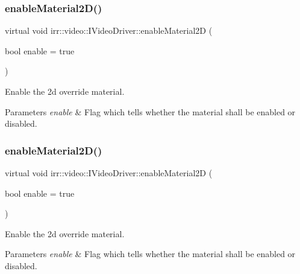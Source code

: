 \subsubsection{\texorpdfstring{enable\+Material2\+D()}{enableMaterial2D()}\hspace{0.1cm}{\footnotesize\ttfamily [1/2]}}
{\footnotesize\ttfamily virtual void irr\+::video\+::\+I\+Video\+Driver\+::enable\+Material2D (\begin{DoxyParamCaption}\item[{bool}]{enable = {\ttfamily true} }\end{DoxyParamCaption})\hspace{0.3cm}{\ttfamily [pure virtual]}}



Enable the 2d override material. 


\begin{DoxyParams}{Parameters}
{\em enable} & Flag which tells whether the material shall be enabled or disabled. \\
\hline
\end{DoxyParams}
\mbox{\label{classirr_1_1video_1_1IVideoDriver_a7686a41fe0f506bb04c262f724f65756}} 
\subsubsection{\texorpdfstring{enable\+Material2\+D()}{enableMaterial2D()}\hspace{0.1cm}{\footnotesize\ttfamily [2/2]}}
{\footnotesize\ttfamily virtual void irr\+::video\+::\+I\+Video\+Driver\+::enable\+Material2D (\begin{DoxyParamCaption}\item[{bool}]{enable = {\ttfamily true} }\end{DoxyParamCaption})\hspace{0.3cm}{\ttfamily [pure virtual]}}



Enable the 2d override material. 


\begin{DoxyParams}{Parameters}
{\em enable} & Flag which tells whether the material shall be enabled or disabled. \\
\hline
\end{DoxyParams}
\mbox{\label{classirr_1_1video_1_1IVideoDriver_a75f61a93c5fc9fdf161c044d27bc994e}} 
